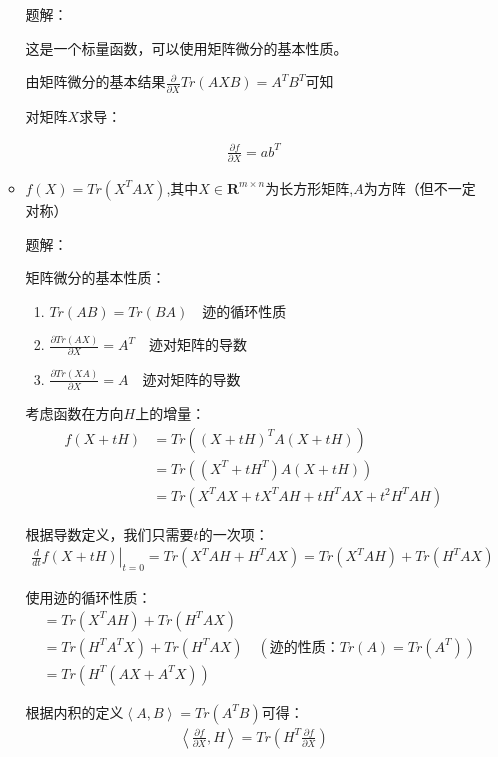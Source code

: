 \documentclass[UTF8]{ctexart}
\begin{document}
\begin{enumerate}
\begin{itemize}
			题解：

			这是一个标量函数，可以使用矩阵微分的基本性质。

			由矩阵微分的基本结果$\frac {\partial}{\partial X}Tr(AXB) = A^TB^T$可知

			对矩阵$X$求导：

			\begin{align*}
				\frac{\partial f}{\partial X} = ab^T
			\end{align*}

			\item $f(X)=Tr(X^TAX)$,其中$X\in\mathbf{R}^{m\times n}$为长方形矩阵,$A$为方阵（但不一定对称）

			题解：

			矩阵微分的基本性质：
			\begin{enumerate}
				\item $Tr(AB) = Tr(BA) \quad \text{迹的循环性质}$
				\item $\frac{\partial Tr(AX)}{\partial X} = A^T \quad \text{迹对矩阵的导数}$
				\item $\frac{\partial Tr(XA)}{\partial X} = A \quad \text{迹对矩阵的导数}$
			\end{enumerate}

			考虑函数在方向$H$上的增量：
			\begin{align*}
				f(X + tH) &= Tr((X + tH)^TA(X + tH)) \\
				&= Tr((X^T + tH^T)A(X + tH)) \\
				&= Tr(X^TAX + tX^TAH + tH^TAX + t^2H^TAH)
			\end{align*}

			根据导数定义，我们只需要$t$的一次项：
			\begin{align*}
				\left.\frac{d}{dt}f(X + tH)\right|_{t=0} = Tr(X^TAH + H^TAX) = Tr(X^TAH) + Tr(H^TAX)
			\end{align*}

			使用迹的循环性质：
			\begin{align*}
				&= Tr(X^TAH) + Tr(H^TAX) \\
				&= Tr(H^TA^TX) + Tr(H^TAX) \quad (\text{迹的性质：}Tr(A) = Tr(A^T)) \\
				&= Tr(H^T(AX + A^TX))
			\end{align*}

			根据内积的定义$\left\langle A,B\right\rangle = Tr(A^TB)$可得：
			\begin{align*}
				\left\langle \frac{\partial f}{\partial X}, H \right\rangle = Tr(H^T\frac{\partial f}{\partial X})
			\end{align*}


\end{itemize}
\end{enumerate}
\end{document}

